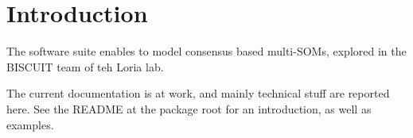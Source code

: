 
\section{Introduction}

The \CxSOM software suite enables to model consensus based multi-SOMs, explored in the BISCUIT team of teh Loria lab.

The current documentation is at work, and mainly technical stuff are reported here. See the README at the package root for an introduction, as well as examples. 
